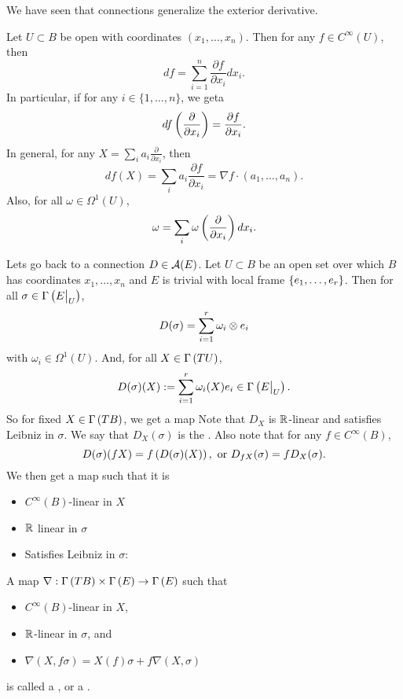 \documentclass[main.tex]{subfiles}
\begin{document}
We have seen that connections generalize the exterior derivative.

 Let $U \subset B$ be open with coordinates $(x_1, \dots, x_n)$. Then for any $f \in C^\infty(U)$, then
\[
df = \sum_{i=1}^n \frac{\partial f}{\partial x_i} dx_i.
\]
In particular, if for any $i \in \{1, \dots, n\}$, we geta
\[
df \left( \frac{\partial}{\partial x_i} \right) = \frac{\partial f}{\partial x_i}.
\]
In general, for any $X = \sum_{i} a_i \frac{\partial}{\partial x_i}$, then
\[
df(X) = \sum_i a_i \frac{\partial f}{\partial x_i} = \nabla f \cdot (a_1, \dots, a_n).
\]
Also, for all $\omega \in \Omega^1(U)$,
\[
\omega = \sum_i \omega\left( \frac{\partial}{\partial x_i} \right) dx_i.
\]

Lets go back to a connection $D \in \mathcal{A}(E)$. Let $U \subset B$ be an open set over which $B$ has coordinates $x_1, \dots, x_n$ and $E$ is trivial with local frame $\left\{e_1, \dots, e_r\right\}$. Then for all $\sigma \in \Gamma\left( E\big|_{U} \right)$,
\[
D(\sigma) = \sum_{i=1}^r \omega_i \otimes e_i
\]
with $\omega_i \in \Omega^1(U)$. And, for all $X \in \Gamma\left( TU \right)$,
\[
D(\sigma)(X) := \sum_{i=1}^r \omega_i(X) e_i \in \Gamma\left( E\big|_{U} \right).
\] So for fixed $X \in \Gamma\left( TB \right)$, we get a map
Note that $D_X$ is $\mathbb{R}$-linear and satisfies Leibniz in $\sigma$. We say that $D_X(\sigma)$ is the . Also note that for any $f \in C^\infty(B)$,
\[
D(\sigma)(fX) = f\left(  D(\sigma)(X)  \right), \text{ or } D_{fX}(\sigma) = f D_X(\sigma).
\]
We then get a map
such that it is
\begin{itemize}
    \item $C^\infty(B)$-linear in $X$
    \item $\mathbb{R}$ linear in $\sigma$
    \item Satisfies Leibniz in $\sigma$:
\end{itemize}

\begin{defn}
A map $\nabla: \Gamma\left( TB \right)\times\Gamma\left( E \right) \to \Gamma\left( E \right) $ such that
\begin{itemize}
    \item $C^\infty(B)$-linear in $X$,
    \item $\mathbb{R}$-linear in $\sigma$, and
    \item $\nabla(X, f\sigma) = X(f)\sigma + f\nabla(X , \sigma)$
\end{itemize} is called a , or a .
\end{defn}
\end{document}
